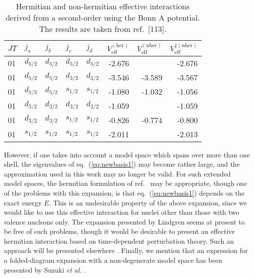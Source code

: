 \begin{table}[hbtp]
\caption{Hermitian and non-hermitian effective
interactions derived from a second-order \qbox using the
Bonn A potential. The results are taken from ref.\ [113].}
\begin{center}
\begin{tabular}{lllllrrr}
\\\hline
$JT$&$j_{a}$&$j_{b}$&$j_{c}$&$j_{d}$&
\multicolumn{1}{c}{$V_{\mathrm{eff}}^{\mathrm{(her)}}$}&
\multicolumn{1}{c}{$V_{\mathrm{eff}}^{\mathrm{(nher)}}$}&
\multicolumn{1}{c}{$V_{\mathrm{eff}}^{\dagger\mathrm{(nher)}}$}
\\\hline
01&$d_{5/2}$&$d_{5/2}$&$d_{5/2}$&$d_{5/2}$&-2.676&&-2.676\\
01&$d_{5/2}$&$d_{5/2}$&$d_{3/2}$&$d_{3/2}$&-3.546&-3.589&-3.567\\
01&$d_{5/2}$&$d_{5/2}$&$s_{1/2}$&$s_{1/2}$&-1.080&-1.032&-1.056\\
01&$d_{3/2}$&$d_{3/2}$&$d_{3/2}$&$d_{3/2}$&-1.059&&-1.059\\
01&$d_{3/2}$&$d_{3/2}$&$s_{1/2}$&$s_{1/2}$&-0.826&-0.774&-0.800\\
01&$s_{1/2}$&$s_{1/2}$&$s_{1/2}$&$s_{1/2}$&-2.011&&-2.013\\
\hline
\end{tabular}
\end{center}
\label{tab:hermiteveff}
\end{table}
However, if one takes into account a model space which spans over more
than one shell, the eigenvalues of eq.\ (\ref{eq:newbasis1}) may become
rather large, and the approximation used in this work may no longer
be valid. For such extended model spaces, the hermitian formulation
of ref.\ \cite{kuo93} may be appropriate, though one of the
problems with this expansion, is that eq.\ (\ref{eq:newbasis1})
depends on the exact energy $E$. This is an undesirable property
of the above expansion, since we would like to use this effective
interaction for nuclei other than those with two valence nucleons
only. The expansion presented by Lindgren \cite{lindgren91} seems
at present to be free of such problems, though it would be desirable
to present an effective hermitian interaction based on time-dependent
perturbation theory. Such an approach will be presented elsewhere
\cite{mhj94}. Finally, we mention that an expression for a folded-diagram
expansion with a non-degenerate model space has been presented by
Suzuki {\em et al.} \cite{suz94}.







